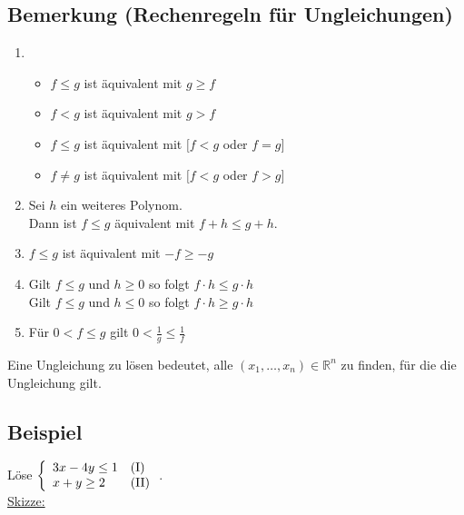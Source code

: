\subsection[Rechenregeln für Ungleichungen]{Bemerkung (Rechenregeln für Ungleichungen)}

	\begin{enumerate}
	\item 	\begin{itemize}
			\item $f \leq g$ ist äquivalent mit $g \geq f$
			\item $f<g$ ist äquivalent mit $g>f$
			\item $f \leq g$ ist äquivalent mit $[f<g$ oder $f=g]$
			\item $f \neq g$ ist äquivalent mit $[f<g$ oder $f>g]$
			\end{itemize}	
	
	\item Sei $h$ ein weiteres Polynom.\\ Dann ist $f \leq g$ äquivalent mit $f+h \leq g+h$.	
	\item $f \leq g$ ist äquivalent mit $-f\geq -g$
	\item Gilt $f \leq g$ und $h \geq 0$ so folgt $f \cdot h \leq g \cdot h$ \\
	Gilt $f \leq g$ und $h \leq 0$ so folgt $f \cdot h \geq g \cdot h$
	\item Für $0<f \leq g$ gilt $0 < \frac{1}{g} \leq \frac{1}{f}$
	
	\end{enumerate} 

	Eine Ungleichung zu lösen bedeutet, alle $(x_1,\dots,x_n)\in \mathbb{R}^n$ zu finden, 
	für die die Ungleichung gilt.
	
	
\subsection{Beispiel}

	Löse  $\left\{  \begin{array}{ll}
                  			3x-4y \leq 1	& \textnormal{(I)}\\
                  			x+y \geq 2		& \textnormal{(II)}
                			\end{array}
                \right.$.\\ \newline \newline
     \underline{Skizze:}
     

